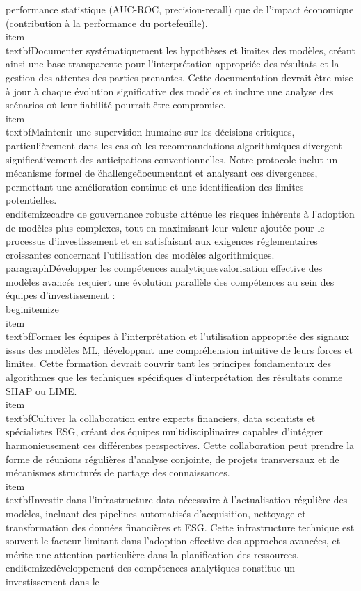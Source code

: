 performance statistique (AUC-ROC, precision-recall) que de l'impact économique (contribution à la performance du portefeuille).\n    \n    \\item \\textbf{Documenter systématiquement les hypothèses et limites des modèles}, créant ainsi une base transparente pour l'interprétation appropriée des résultats et la gestion des attentes des parties prenantes. Cette documentation devrait être mise à jour à chaque évolution significative des modèles et inclure une analyse des scénarios où leur fiabilité pourrait être compromise.\n    \n    \\item \\textbf{Maintenir une supervision humaine sur les décisions critiques}, particulièrement dans les cas où les recommandations algorithmiques divergent significativement des anticipations conventionnelles. Notre protocole inclut un mécanisme formel de \"challenge\" documentant et analysant ces divergences, permettant une amélioration continue et une identification des limites potentielles.\n\\end{itemize}\n\nCe cadre de gouvernance robuste atténue les risques inhérents à l'adoption de modèles plus complexes, tout en maximisant leur valeur ajoutée pour le processus d'investissement et en satisfaisant aux exigences réglementaires croissantes concernant l'utilisation des modèles algorithmiques.\n\n\\paragraph{Développer les compétences analytiques}\n\nLa valorisation effective des modèles avancés requiert une évolution parallèle des compétences au sein des équipes d'investissement :\n\\begin{itemize}\n    \\item \\textbf{Former les équipes à l'interprétation et l'utilisation appropriée des signaux issus des modèles ML}, développant une compréhension intuitive de leurs forces et limites. Cette formation devrait couvrir tant les principes fondamentaux des algorithmes que les techniques spécifiques d'interprétation des résultats comme SHAP ou LIME.\n    \n    \\item \\textbf{Cultiver la collaboration entre experts financiers, data scientists et spécialistes ESG}, créant des équipes multidisciplinaires capables d'intégrer harmonieusement ces différentes perspectives. Cette collaboration peut prendre la forme de réunions régulières d'analyse conjointe, de projets transversaux et de mécanismes structurés de partage des connaissances.\n    \n    \\item \\textbf{Investir dans l'infrastructure data nécessaire à l'actualisation régulière des modèles}, incluant des pipelines automatisés d'acquisition, nettoyage et transformation des données financières et ESG. Cette infrastructure technique est souvent le facteur limitant dans l'adoption effective des approches avancées, et mérite une attention particulière dans la planification des ressources.\n\\end{itemize}\n\nCe développement des compétences analytiques constitue un investissement dans le 